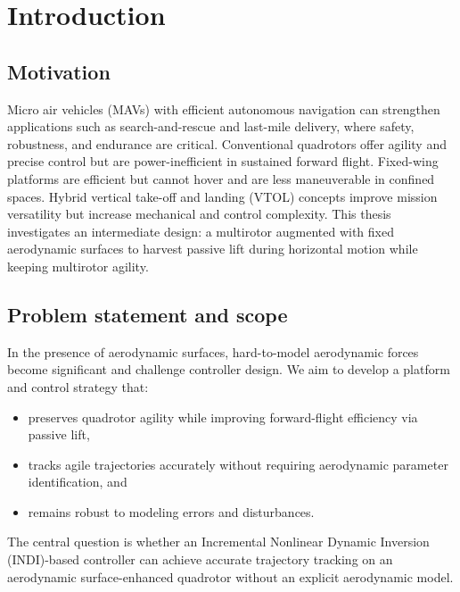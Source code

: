 
\chapter{Introduction}\label{chapter:introduction}

\section{Motivation}
Micro air vehicles (MAVs) with efficient autonomous navigation can strengthen applications such as search-and-rescue and last-mile delivery, where safety, robustness, and endurance are critical. Conventional quadrotors offer agility and precise control but are power-inefficient in sustained forward flight. Fixed-wing platforms are efficient but cannot hover and are less maneuverable in confined spaces. Hybrid vertical take-off and landing (VTOL) concepts improve mission versatility but increase mechanical and control complexity. This thesis investigates an intermediate design: a multirotor augmented with fixed aerodynamic surfaces to harvest passive lift during horizontal motion while keeping multirotor agility.

\section{Problem statement and scope}
In the presence of aerodynamic surfaces, hard-to-model aerodynamic forces become significant and challenge controller design. We aim to develop a platform and control strategy that:
\begin{itemize}
  \item preserves quadrotor agility while improving forward-flight efficiency via passive lift,
  \item tracks agile trajectories accurately without requiring aerodynamic parameter identification, and
  \item remains robust to modeling errors and disturbances.
\end{itemize}
The central question is whether an Incremental Nonlinear Dynamic Inversion (INDI)-based controller can achieve accurate trajectory tracking on an aerodynamic surface-enhanced quadrotor without an explicit aerodynamic model.

